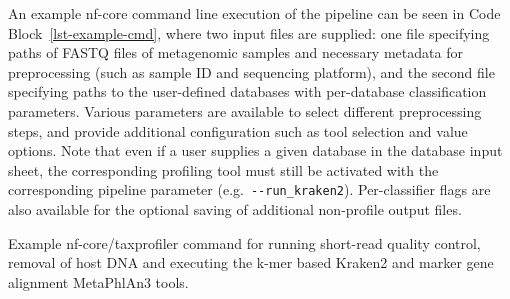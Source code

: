 \documentclass[
]{article}
\newenvironment{Shaded}{}{}
\newcommand{\AttributeTok}[1]{\textcolor[rgb]{0.84,0.23,0.29}{#1}}
\newcommand{\DataTypeTok}[1]{\textcolor[rgb]{0.84,0.23,0.29}{#1}}
\newcommand{\ExtensionTok}[1]{\textcolor[rgb]{0.84,0.23,0.29}{\textbf{#1}}}
\newcommand{\NormalTok}[1]{\textcolor[rgb]{0.14,0.16,0.18}{#1}}
\newcommand{\OperatorTok}[1]{\textcolor[rgb]{0.14,0.16,0.18}{#1}}
\newcommand{\StringTok}[1]{\textcolor[rgb]{0.01,0.18,0.38}{#1}}
\begin{document}
An example nf-core command line execution of the pipeline can be seen in
Code Block~\ref{lst-example-cmd}, where two input files are supplied:
one file specifying paths of FASTQ files of metagenomic samples and
necessary metadata for preprocessing (such as sample ID and sequencing
platform), and the second file specifying paths to the user-defined
databases with per-database classification parameters. Various
parameters are available to select different preprocessing steps, and
provide additional configuration such as tool selection and value
options. Note that even if a user supplies a given database in the
database input sheet, the corresponding profiling tool must still be
activated with the corresponding pipeline parameter
(e.g.~\texttt{-\/-run\_kraken2}). Per-classifier flags are also
available for the optional saving of additional non-profile output
files.

\begin{codelisting}

\caption{Example nf-core/taxprofiler command for running short-read
quality control, removal of host DNA and executing the k-mer based
Kraken2 and marker gene alignment MetaPhlAn3 tools.}

\hypertarget{lst-example-cmd}{%
\label{lst-example-cmd}}%
\begin{Shaded}
\end{Shaded}

\end{codelisting}
\end{document}
